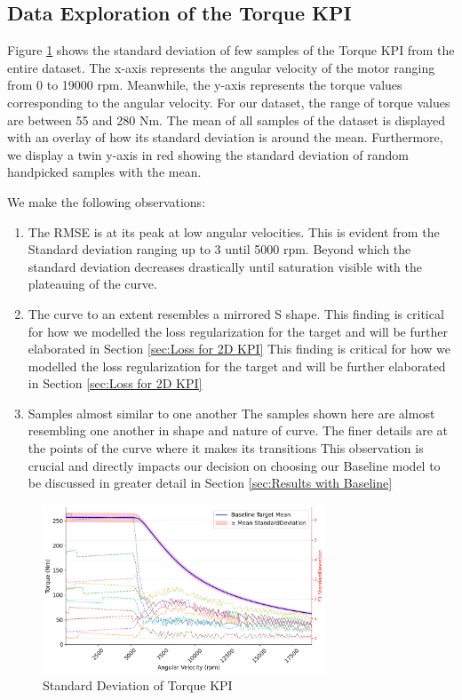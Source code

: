 \documentclass{report} %
\begin{document}
\subsection{Data Exploration of the Torque \ac{KPI}}\label{subsec:Deep Dive into 2D KPI}
Figure \ref{fig:Standard Deviation of 2D KPI} shows the standard deviation of few samples of the Torque \ac{KPI} from the entire dataset.
The x-axis represents the angular velocity of the motor ranging from 0 to 19000 rpm. Meanwhile, the y-axis represents the torque values corresponding to the angular velocity.
For our dataset, the range of torque values are between 55 and 280 Nm. 
The mean of all samples of the dataset is displayed with an overlay of how its standard deviation is around the mean.
Furthermore, we display a twin y-axis in red showing the standard deviation of random handpicked samples with the mean.

We make the following observations:
\begin{enumerate}
    \item The \ac{RMSE} is at its peak at low angular velocities.
    This is evident from the Standard deviation ranging up to 3 until 5000 rpm. Beyond which the standard deviation decreases drastically until 
    saturation visible with the plateauing of the curve.
    \item The curve to an extent resembles a mirrored S shape.                             
    This finding is critical for how we modelled the loss regularization for the target and will be further elaborated in Section \ref{sec:Loss for 2D KPI}
    This finding is critical for how we modelled the loss regularization for the target and will be further elaborated in Section \ref{sec:Loss for 2D KPI}
    \item Samples almost similar to one another
    The samples shown here are almost resembling one another in shape and nature of curve. The finer details are at the points of the curve where it makes its transitions 
    This observation is crucial and directly impacts our  decision on choosing our Baseline model to be discussed in greater detail in Section \ref{sec:Results with Baseline}
\end{enumerate}

\begin{figure}[H]
    \centering
    \includegraphics[width=0.75\textwidth]{./ReportImages/StandardDeviation_Baseline_y1.png} 
    \caption{Standard Deviation of Torque KPI} 
    \label{fig:Standard Deviation of 2D KPI}
\end{figure}
\end{document}
